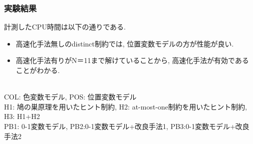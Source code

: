 \documentclass [dvipdfmx,12pt]{beamer}
\begin{document}
\begin{frame}
    \frametitle{実験結果}
    計測したCPU時間は以下の通りである.
    \begin{block}{}
        {\tiny  }
    \end{block}
    \begin{itemize}
        \item 高速化手法無しのdistinct制約では, 位置変数モデルの方が性能が良い.
        \item 高速化手法有りがN＝11まで解けていることから, 高速化手法が有効であることがわかる.
    \end{itemize}
    \\
    \vspace{-3mm}
    {\tiny COL: 色変数モデル, POS: 位置変数モデル}\\
    \vspace{-3mm}
    {\tiny H1: 鳩の巣原理を用いたヒント制約, H2: at-most-one制約を用いたヒント制約, H3: H1+H2}\\
    \vspace{-3mm}
    {\tiny PB1: 0-1変数モデル, PB2:0-1変数モデル+改良手法1, PB3:0-1変数モデル+改良手法2}\\
\end{frame}
\end{document}
